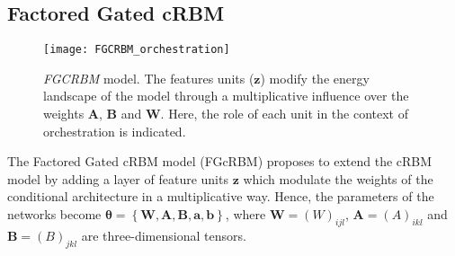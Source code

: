 \documentclass[letterpaper]{article}
\begin{document}
\subsection{Factored Gated cRBM}
\begin{figure}
\centering
\texttt{[image: FGCRBM\_orchestration]}
\caption{\textit{FGCRBM} model. The features units ($\bm{z}$) modify the energy landscape of the model through a multiplicative influence over the weights $\bm{A}$, $\bm{B}$ and $\bm{W}$. Here, the role of each unit in the context of orchestration is indicated.}
\label{fig:FGCRBM}
\end{figure}
The Factored Gated cRBM model (FGcRBM) \cite{taylor2009factored} proposes to extend the cRBM model by adding a layer of feature units $\bm{z}$ which modulate the weights of the conditional architecture in a multiplicative way. Hence, the parameters of the networks become $\bm{\theta} = \left\lbrace \bm{W} , \bm{A} , \bm{B} , \bm{a} , \bm{b} \right\rbrace$, where $\bm{W} = (W)_{ijl}$, $\bm{A}=(A)_{ikl}$ and $\bm{B}=(B)_{jkl}$ are three-dimensional tensors.
\end{document}
